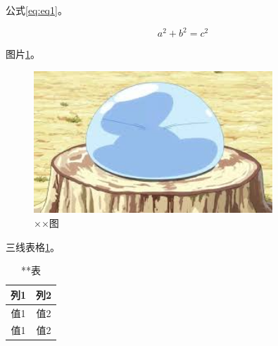 \documentclass{csuthesis}
\begin{document}
    公式\ref{eq:eq1}。

    \begin{equation}
        a^2 + b^2 = c^2 \label{eq:eq1}
    \end{equation}

    图片\ref{fig:image1}。
    \begin{figure}
        \centering
        \includegraphics[width=0.8\textwidth]{images/image.jpeg}
        \caption{××图}
        \label{fig:image1}
    \end{figure}

    三线表格\ref{tab:table1}。
    \begin{table}
        \centering
        \caption{**表}
        \label{tab:table1}
        \begin{tabular}{c c}
            \toprule[1.5bp]
            列1 & 列2 \\
            \midrule[0.75bp]
            值1 & 值2 \\
            值1 & 值2 \\
            \bottomrule[1.5bp]
        \end{tabular}
    \end{table}
\end{document}
